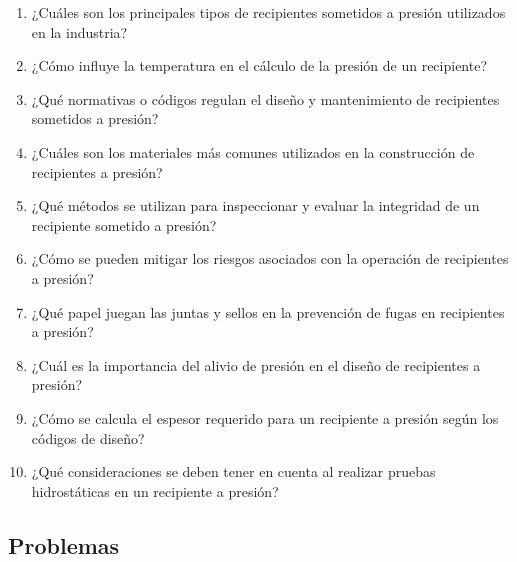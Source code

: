 \documentclass[../main]{subfiles}
\begin{document}
\begin{enumerate}
    \item ¿Cuáles son los principales tipos de recipientes sometidos a presión utilizados en la industria?
    \item ¿Cómo influye la temperatura en el cálculo de la presión de un recipiente?
    \item ¿Qué normativas o códigos regulan el diseño y mantenimiento de recipientes sometidos a presión?
    \item ¿Cuáles son los materiales más comunes utilizados en la construcción de recipientes a presión?
    \item ¿Qué métodos se utilizan para inspeccionar y evaluar la integridad de un recipiente sometido a presión?
    \item ¿Cómo se pueden mitigar los riesgos asociados con la operación de recipientes a presión?
    \item ¿Qué papel juegan las juntas y sellos en la prevención de fugas en recipientes a presión?
    \item ¿Cuál es la importancia del alivio de presión en el diseño de recipientes a presión?
    \item ¿Cómo se calcula el espesor requerido para un recipiente a presión según los códigos de diseño?
    \item ¿Qué consideraciones se deben tener en cuenta al realizar pruebas hidrostáticas en un recipiente a presión?
\end{enumerate}

\subsection{Problemas}
\end{document}
